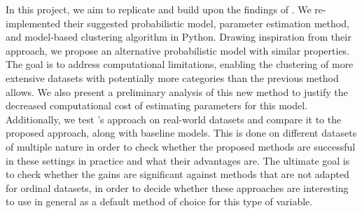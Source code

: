In this project, we aim to replicate and build upon the findings of \cite{biernacki2016model}. We re-implemented their suggested probabilistic model, parameter estimation method, and model-based clustering algorithm in Python. Drawing inspiration from their approach, we propose an alternative probabilistic model with similar properties. The goal is to address computational limitations, enabling the clustering of more extensive datasets with potentially more categories than the previous method allows. We also present a preliminary analysis of this new method to justify the decreased computational cost of estimating parameters for this model. Additionally, we  test \cite{biernacki2016model}'s approach on real-world datasets and compare it to the proposed approach, along with baseline models. This is done on different datasets of multiple nature in order to check whether the proposed methods are successful in these settings in practice and what their advantages are. The ultimate goal is to check whether the gains are significant against methods that are not adapted for ordinal datasets, in order to decide whether these approaches are interesting to use in general as a default method of choice for this type of variable.


